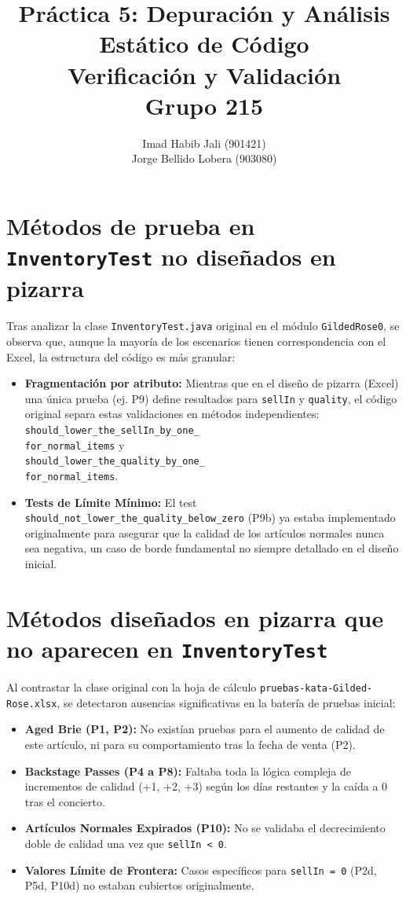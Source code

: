\documentclass[12pt,a4paper]{article}
\title{\textbf{Práctica 5: Depuración y Análisis Estático de Código}\\Verificación y Validación\\Grupo 215}
\author{Imad Habib Jali (901421) \\ Jorge Bellido Lobera (903080)}
\date{}
\begin{document}
\maketitle

\section{Métodos de prueba en \texttt{InventoryTest} no diseñados en pizarra}
Tras analizar la clase \texttt{InventoryTest.java} original en el módulo \texttt{GildedRose0}, se observa que, aunque la mayoría de los escenarios tienen correspondencia con el Excel, la estructura del código es más granular:

\begin{itemize}
    \item \textbf{Fragmentación por atributo:} Mientras que en el diseño de pizarra (Excel) una única prueba (ej. P9) define resultados para \texttt{sellIn} y \texttt{quality}, el código original separa estas validaciones en métodos independientes: \\ \texttt{should\_lower\_the\_sellIn\_by\_one\_} \\ \texttt{for\_normal\_items} y \\ \texttt{should\_lower\_the\_quality\_by\_one\_} \\ \texttt{for\_normal\_items}.
    \item \textbf{Tests de Límite Mínimo:} El test \texttt{should\_not\_lower\_the\_quality\_below\_zero} (P9b) ya estaba implementado originalmente para asegurar que la calidad de los artículos normales nunca sea negativa, un caso de borde fundamental no siempre detallado en el diseño inicial.
\end{itemize}

\section{Métodos diseñados en pizarra que no aparecen en \texttt{InventoryTest}}
Al contrastar la clase original con la hoja de cálculo \texttt{pruebas-kata-Gilded-Rose.xlsx}, se detectaron ausencias significativas en la batería de pruebas inicial:

\begin{itemize}
    \item \textbf{Aged Brie (P1, P2):} No existían pruebas para el aumento de calidad de este artículo, ni para su comportamiento tras la fecha de venta (P2).
    \item \textbf{Backstage Passes (P4 a P8):} Faltaba toda la lógica compleja de incrementos de calidad (+1, +2, +3) según los días restantes y la caída a 0 tras el concierto.
    \item \textbf{Artículos Normales Expirados (P10):} No se validaba el decrecimiento doble de calidad una vez que \texttt{sellIn < 0}.
    \item \textbf{Valores Límite de Frontera:} Casos específicos para \texttt{sellIn = 0} (P2d, P5d, P10d) no estaban cubiertos originalmente.
\end{itemize}
\end{document}
